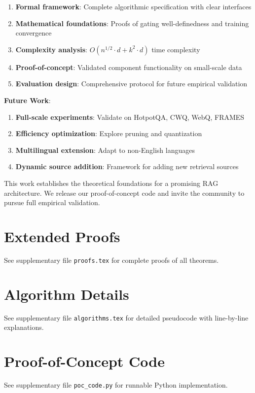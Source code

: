 \documentclass[10pt,twocolumn]{article}
\begin{document}
\begin{enumerate}
    \item \textbf{Formal framework}: Complete algorithmic specification with clear interfaces
    \item \textbf{Mathematical foundations}: Proofs of gating well-definedness and training convergence
    \item \textbf{Complexity analysis}: $O(n^{1/2} \cdot d + k^2 \cdot d)$ time complexity
    \item \textbf{Proof-of-concept}: Validated component functionality on small-scale data
    \item \textbf{Evaluation design}: Comprehensive protocol for future empirical validation
\end{enumerate}

\textbf{Future Work}:
\begin{enumerate}
    \item \textbf{Full-scale experiments}: Validate on HotpotQA, CWQ, WebQ, FRAMES
    \item \textbf{Efficiency optimization}: Explore pruning and quantization
    \item \textbf{Multilingual extension}: Adapt to non-English languages
    \item \textbf{Dynamic source addition}: Framework for adding new retrieval sources
\end{enumerate}

This work establishes the theoretical foundations for a promising RAG architecture. We release our proof-of-concept code and invite the community to pursue full empirical validation.




\appendix

\section{Extended Proofs}
\label{app:proofs}

See supplementary file \texttt{proofs.tex} for complete proofs of all theorems.

\section{Algorithm Details}
\label{app:algorithms}

See supplementary file \texttt{algorithms.tex} for detailed pseudocode with line-by-line explanations.

\section{Proof-of-Concept Code}
\label{app:code}

See supplementary file \texttt{poc\_code.py} for runnable Python implementation.
\end{document}
